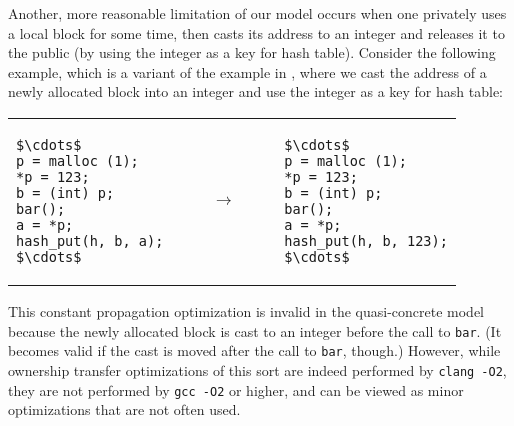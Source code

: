 Another, more reasonable limitation of our model occurs when one privately uses a local block for some time, then casts its address to an integer and releases it to the
public (\eg by using the integer as a key for hash table).  Consider the following example, which is a variant of the example in ,
where we cast the address of a newly allocated block into an integer
and use the integer as a key for hash table:
\begin{center}
\begin{tabular}{@{}l@{}l@{}l@{}}
\begin{lstlisting}
$\cdots$
p = malloc (1);
*p = 123;
b = (int) p;
bar();
a = *p;
hash_put(h, b, a);
$\cdots$
\end{lstlisting}
&
$\qquad\rightarrow\qquad$
&
\begin{lstlisting}
$\cdots$
p = malloc (1);
*p = 123;
b = (int) p;
bar();
a = *p;
hash_put(h, b, 123);
$\cdots$
\end{lstlisting}
\end{tabular}
\end{center}

This constant propagation optimization is invalid in the
quasi-concrete model because the newly allocated block is cast to an
integer before the call to \texttt{bar}.  (It becomes valid if the
cast is moved after the call to \texttt{bar}, though.)  However, while
ownership transfer optimizations of this sort are indeed performed by
\texttt{clang -O2}, they are not performed by \texttt{gcc -O2} or
higher, and can be viewed as minor optimizations that are not often
used.






